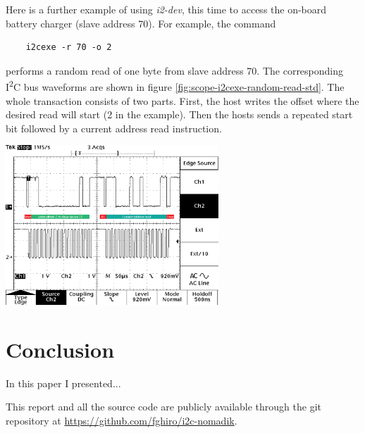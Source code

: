 \documentclass[a4paper,10pt]{article}
\makeatletter
\newenvironment{figurehere}{\def\@captype{figure}\vspace{2ex}}{\vspace{2ex}}
\newcommand{\iic}{I\textsuperscript{2}C }
\makeatother
\begin{document}
\begin{multicols}{2}
Here is a further example of using \emph{i2-dev}, this time to access
the on-board battery charger (slave address 70). For example, the command
\begin{verbatim}
	i2cexe -r 70 -o 2
\end{verbatim}
performs a random read of one byte from slave address 70. The corresponding \iic
bus waveforms are shown in figure \ref{fig:scope-i2cexe-random-read-std}.
The whole transaction consists of two parts. First, the host writes the offset
where the desired read will start (2 in the example). Then the hosts sends a
repeated start bit followed by a current address read instruction.

\begin{figurehere}
 \centering
 \includegraphics[width=8cm]{./figures/scope-i2cexe-random-read-std.png}
 \caption{SCL and SDA waveforms of a random read operation from slave address 70
	at offset 2.}
 \label{fig:scope-i2cexe-random-read-std}
\end{figurehere}



\section{Conclusion}

In this paper I presented...

This report and all the source code are publicly available through the git
repository at \url{https://github.com/fghiro/i2c-nomadik}.  


\nocite{rubini2005ldd}
\nocite{yaghmour2008bels}
\nocite{sally2009proles}
\nocite{love2010lkd}
\nocite{nxp-i2c-spec}
\nocite{linux-kernel-archive}
\nocite{loeliger2012git}




\end{multicols}
\end{document}
